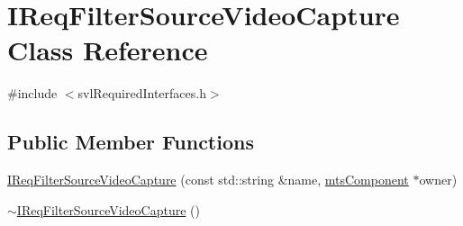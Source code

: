\hypertarget{class_i_req_filter_source_video_capture}{\section{I\-Req\-Filter\-Source\-Video\-Capture Class Reference}
\label{class_i_req_filter_source_video_capture}
}


{\ttfamily \#include $<$svl\-Required\-Interfaces.\-h$>$}

\subsection*{Public Member Functions}
\begin{DoxyCompactItemize}
\item 
\hyperlink{class_i_req_filter_source_video_capture_ac45bb4ea00b746197a790b1e7ce8929e}{I\-Req\-Filter\-Source\-Video\-Capture} (const std\-::string \&name, \hyperlink{classmts_component}{mts\-Component} $\ast$owner)
\item 
\hyperlink{class_i_req_filter_source_video_capture_a45eca1d8c0daeccc6cb4a821922f7e9e}{$\sim$\-I\-Req\-Filter\-Source\-Video\-Capture} ()
\end{DoxyCompactItemize}
